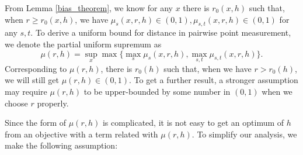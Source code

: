 \documentclass[aos,preprint]{imsart}
\theoremstyle{remark}
\begin{document}
From Lemma \ref{bias_theorem}, we know for any $x$ there is $r_0(x,h)$ such that, when $r\geq r_0(x,h)$, we have $\mu_s(x,r,h)\in (0,1), \mu_{s,t}(x,r,h)\in(0,1)$ for any $s,t$. To derive a uniform bound for distance in pairwise point measurement, we denote the partial uniform supremum as
\[
\mu(r,h) = \sup_x \max\{\max_s \mu_s(x,r,h), \max_{s,t}\mu_{s,t}(x,r,h)\}.
\]
Corresponding to $\mu(r,h)$, there is $r_0(h)$ such that, 
when we have $r>r_0(h)$, we will still get $\mu(r,h)\in(0,1)$. To get a further result,  a stronger assumption may require $\mu(r,h)$ to be upper-bounded by some number in $(0,1)$ when we choose $r$ properly.

Since the form of $\mu(r,h)$ is complicated, it is not easy to get an optimum of $h$ from an objective with a term related with $\mu(r,h)$. To simplify our analysis, we make the following assumption:
\end{document}
